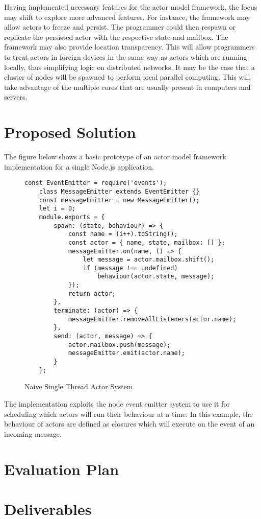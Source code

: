 \documentclass[12pt]{report}
\begin{document}
Having implemented necessary features for the actor model framework, the focus may shift to explore more advanced features. For instance, the framework may allow actors to freeze and persist. The programmer could then respawn or replicate the persisted actor with the respective state and mailbox. The framework may also provide location transparency. This will allow programmers to treat actors in foreign devices in the same way as actors which are running locally, thus simplifying logic on distributed networks. It may be the case that a cluster of nodes will be spawned to perform local parallel computing. This will take advantage of the multiple cores that are usually present in computers and servers.
\section{Proposed Solution}
The figure below shows a basic prototype of an actor model framework implementation for a single Node.js application.
\begin{figure}[H]
  \begin{lstlisting}[gobble=2]
    const EventEmitter = require('events');
    class MessageEmitter extends EventEmitter {}
    const messageEmitter = new MessageEmitter();
    let i = 0;
    module.exports = {
        spawn: (state, behaviour) => {
            const name = (i++).toString();
            const actor = { name, state, mailbox: [] };
            messageEmitter.on(name, () => {
                let message = actor.mailbox.shift();
                if (message !== undefined)
                    behaviour(actor.state, message);
            });
            return actor;
        },
        terminate: (actor) => {
            messageEmitter.removeAllListeners(actor.name);
        },
        send: (actor, message) => {
            actor.mailbox.push(message);
            messageEmitter.emit(actor.name);
        }
    };
  \end{lstlisting}
  \caption{Naive Single Thread Actor System}
\end{figure}
The implementation exploits the node event emitter system to use it for scheduling which actors will run their behaviour at a time. In this example, the behaviour of actors are defined as closures which will execute on the event of an incoming message.
\section{Evaluation Plan}
\section{Deliverables}


\end{document}
